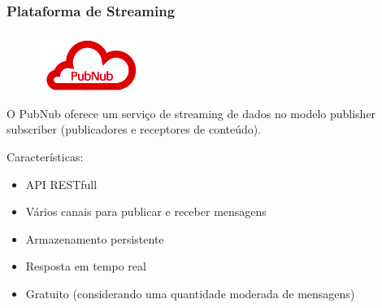 \documentclass{beamer}
\begin{document}
\begin{frame}
\frametitle{Plataforma de Streaming}
\begin{minipage}{\textwidth}
	
	\begin{figure}
		\begin{center}
			\includegraphics[width=0.3\textwidth]{pubnub.png}
		\end{center}
	\end{figure}
	O PubNub oferece um serviço de streaming de dados no modelo publisher subscriber (publicadores e receptores de conteúdo).
	
	Características:
	
	\begin{itemize}
		\item API RESTfull
		\item Vários canais para publicar e receber mensagens
		\item Armazenamento persistente
		\item Resposta em tempo real
		\item Gratuito (considerando uma quantidade moderada de mensagens)
	\end{itemize}
	
\end{minipage}
\end{frame}
\end{document}
